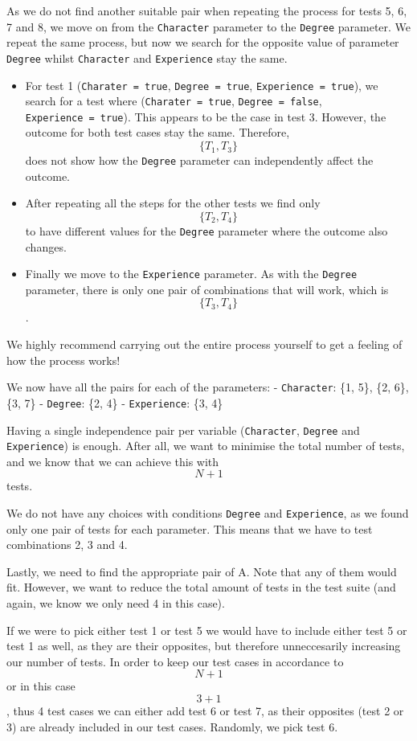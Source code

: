 As we do not find another suitable pair when repeating the process for
tests 5, 6, 7 and 8, we move on from the \texttt{Character} parameter to
the \texttt{Degree} parameter. We repeat the same process, but now we
search for the opposite value of parameter \texttt{Degree} whilst
\texttt{Character} and \texttt{Experience} stay the same.

\begin{itemize}
\item
  For test 1 (\texttt{Charater\ =\ true}, \texttt{Degree\ =\ true},
  \texttt{Experience\ =\ true}), we search for a test where
  (\texttt{Charater\ =\ true}, \texttt{Degree\ =\ false},
  \texttt{Experience\ =\ true}). This appears to be the case in test 3.
  However, the outcome for both test cases stay the same. Therefore,
  \[\{T_1, T_3\}\] does not show how the \texttt{Degree} parameter can
  independently affect the outcome.
\item
  After repeating all the steps for the other tests we find only
  \[\{T_2, T_4\}\] to have different values for the \texttt{Degree}
  parameter where the outcome also changes.
\item
  Finally we move to the \texttt{Experience} parameter. As with the
  \texttt{Degree} parameter, there is only one pair of combinations that
  will work, which is \[\{T_3, T_4\}\].
\end{itemize}

We highly recommend carrying out the entire process yourself to get a
feeling of how the process works!

We now have all the pairs for each of the parameters: -
\texttt{Character}: \{1, 5\}, \{2, 6\}, \{3, 7\} - \texttt{Degree}: \{2,
4\} - \texttt{Experience}: \{3, 4\}

Having a single independence pair per variable (\texttt{Character},
\texttt{Degree} and \texttt{Experience}) is enough. After all, we want
to minimise the total number of tests, and we know that we can achieve
this with \[N+1\] tests.

We do not have any choices with conditions \texttt{Degree} and
\texttt{Experience}, as we found only one pair of tests for each
parameter. This means that we have to test combinations 2, 3 and 4.

Lastly, we need to find the appropriate pair of A. Note that any of them
would fit. However, we want to reduce the total amount of tests in the
test suite (and again, we know we only need 4 in this case).

If we were to pick either test 1 or test 5 we would have to include
either test 5 or test 1 as well, as they are their opposites, but
therefore unneccesarily increasing our number of tests. In order to keep
our test cases in accordance to \[N+1\] or in this case \[3+1\], thus 4
test cases we can either add test 6 or test 7, as their opposites (test
2 or 3) are already included in our test cases. Randomly, we pick test
6.

